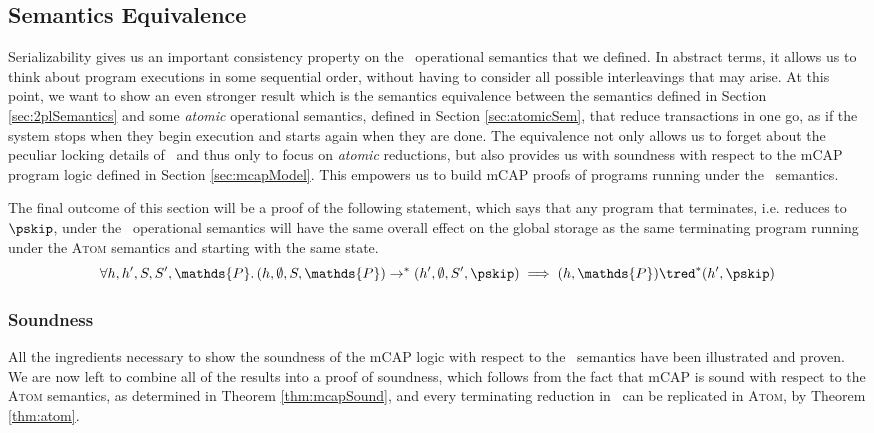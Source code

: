\subsection{Semantics Equivalence}

Serializability gives us an important consistency property on the \tpl\ operational semantics that we defined. In abstract terms, it allows us to think about program executions in some sequential order, without having to consider all possible interleavings that may arise. At this point, we want to show an even stronger result which is the semantics equivalence between the semantics defined in Section \ref{sec:2plSemantics} and some \textit{atomic} operational semantics, defined in Section \ref{sec:atomicSem}, that reduce transactions in one go, as if the system stops when they begin execution and starts again when they are done. The equivalence not only allows us to forget about the peculiar locking details of \tpl\ and thus only to focus on \textit{atomic} reductions, but also provides us with soundness with respect to the mCAP program logic defined in Section \ref{sec:mcapModel}. This empowers us to build mCAP proofs of programs running under the \tpl\ semantics.

The final outcome of this section will be a proof of the following statement, which says that any program that terminates, i.e. reduces to $\pskip$, under the \tpl\ operational semantics will have the same overall effect on the global storage as the same terminating program running under the \textsc{Atom} semantics and starting with the same state.
\[
	\forall h, h', S, S', \mathds{P} \ldotp
	(h, \emptyset, S, \mathds{P}) \rightarrow^* (h', \emptyset, S', \pskip) \implies 
	(h, \mathds{P}) \tred^* (h', \pskip)
\]

%



%



\iftrue
\subsubsection{Soundness}

All the ingredients necessary to show the soundness of the mCAP logic with respect to the \tpl\ semantics have been illustrated and proven. We are now left to combine all of the results into a proof of soundness, which follows from the fact that mCAP is sound with respect to the \textsc{Atom} semantics, as determined in Theorem \ref{thm:mcapSound}, and every terminating reduction in \tpl\ can be replicated in \textsc{Atom}, by Theorem \ref{thm:atom}.

